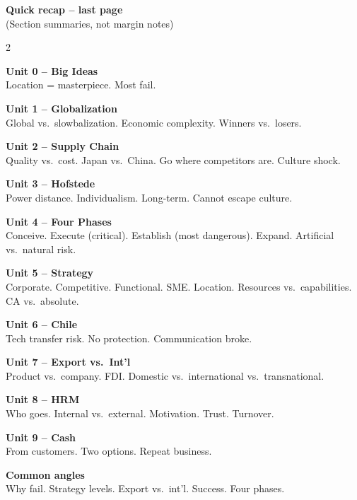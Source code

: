 \documentclass[8pt,landscape,a4paper]{article}
\begin{document}
\newpage
\vspace*{0.3em}
\begin{center}
\textbf{\color{eublue}Quick recap -- last page}\\[0.3em]
\small\textcolor{notegrey}{(Section summaries, not margin notes)}
\end{center}
\vspace{0.4em}
\noindent\color{notegrey}
\setlength{\parskip}{0.3em}
\begin{multicols}{2}

\textbf{Unit 0 -- Big Ideas}\\
Location = masterpiece. Most fail.

\textbf{Unit 1 -- Globalization}\\
Global vs.\ slowbalization. Economic complexity. Winners vs.\ losers.

\textbf{Unit 2 -- Supply Chain}\\
Quality vs.\ cost. Japan vs.\ China. Go where competitors are. Culture shock.

\textbf{Unit 3 -- Hofstede}\\
Power distance. Individualism. Long-term. Cannot escape culture.

\textbf{Unit 4 -- Four Phases}\\
Conceive. Execute (critical). Establish (most dangerous). Expand. Artificial vs.\ natural risk.

\textbf{Unit 5 -- Strategy}\\
Corporate. Competitive. Functional. SME. Location. Resources vs.\ capabilities. CA vs.\ absolute.

\textbf{Unit 6 -- Chile}\\
Tech transfer risk. No protection. Communication broke.

\textbf{Unit 7 -- Export vs.\ Int'l}\\
Product vs.\ company. FDI. Domestic vs.\ international vs.\ transnational.

\textbf{Unit 8 -- HRM}\\
Who goes. Internal vs.\ external. Motivation. Trust. Turnover.

\textbf{Unit 9 -- Cash}\\
From customers. Two options. Repeat business.

\textbf{Common angles}\\
Why fail. Strategy levels. Export vs.\ int'l. Success. Four phases.

\end{multicols}
\vfill
\normalsize\normalfont\color{black}
\end{document}
